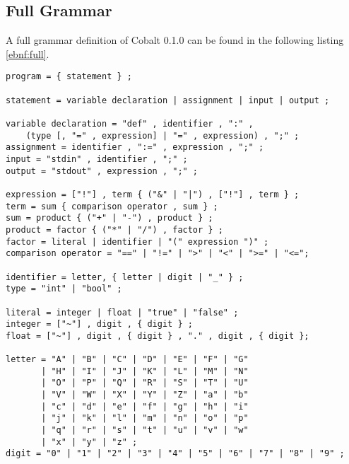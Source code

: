 \documentclass[a4paper,appendixprefix]{scrreprt}
\begin{document}
\appendix
\renewcommand\appendixtocname{Appendix}
\renewcommand\appendixpagename{Appendix}
\begin{appendices}
\renewcommand\thechapter{\appendixname\space\Alph{chapter}}
\chapter{Full Grammar}\label{app:fullgrammar}
A full grammar definition of Cobalt 0.1.0 can be found in the following listing \ref{ebnf:full}.
\begin{lstlisting}[label={ebnf:full},caption={Literals Grammar}]
program = { statement } ;
 
statement = variable declaration | assignment | input | output ;
 
variable declaration = "def" , identifier , ":" , 
	(type [, "=" , expression] | "=" , expression) , ";" ;
assignment = identifier , ":=" , expression , ";" ;
input = "stdin" , identifier , ";" ;
output = "stdout" , expression , ";" ;
 
expression = ["!"] , term { ("&" | "|") , ["!"] , term } ;
term = sum { comparison operator , sum } ;
sum = product { ("+" | "-") , product } ;
product = factor { ("*" | "/") , factor } ;
factor = literal | identifier | "(" expression ")" ;
comparison operator = "==" | "!=" | ">" | "<" | ">=" | "<=";
 
identifier = letter, { letter | digit | "_" } ;
type = "int" | "bool" ;
 
literal = integer | float | "true" | "false" ;
integer = ["~"] , digit , { digit } ;
float = ["~"] , digit , { digit } , "." , digit , { digit };

letter = "A" | "B" | "C" | "D" | "E" | "F" | "G"
       | "H" | "I" | "J" | "K" | "L" | "M" | "N"
       | "O" | "P" | "Q" | "R" | "S" | "T" | "U"
       | "V" | "W" | "X" | "Y" | "Z" | "a" | "b"
       | "c" | "d" | "e" | "f" | "g" | "h" | "i"
       | "j" | "k" | "l" | "m" | "n" | "o" | "p"
       | "q" | "r" | "s" | "t" | "u" | "v" | "w"
       | "x" | "y" | "z" ;
digit = "0" | "1" | "2" | "3" | "4" | "5" | "6" | "7" | "8" | "9" ;
\end{lstlisting}
\end{appendices}
\end{document}
